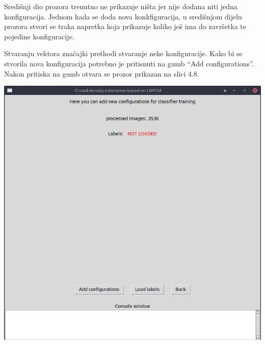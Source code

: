\documentclass[times, utf8, zavrsni]{fer}
\begin{document}
Središnji dio prozora trenutno ne prikazuje ništa jer nije dodana niti jedna
konfiguracija. Jednom kada se doda nova konkfiguracija, u središnjom dijelu
prozora stvori se traka napretka koja prikazuje koliko još ima do završetka 
te pojedine konfiguracije. 

Stvaranju vektora značajki prethodi stvaranje neke konfiguracije. Kako bi se 
stvorila nova konfiguracija potrebno je pritisnuti na gumb \enquote{Add configurations}.
Nakon pritiska na gumb otvara se prozor prikazan na slici 4.8.

\newpage

\begin{minipage}{\linewidth}
\centering
\includegraphics[scale=0.35]{img/fvc1.png}
\end{minipage}

\bigbreak
\end{document}
